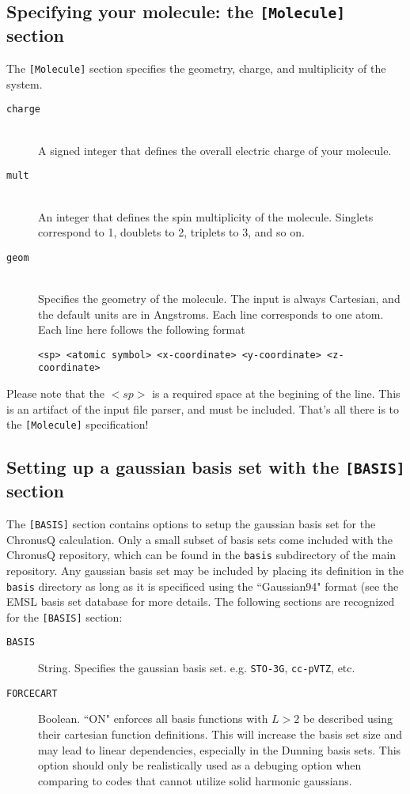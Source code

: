 \documentclass[12pt]{article}
\begin{document}
    \subsection{Specifying your molecule: the \texttt{[Molecule]} section} \label{subsec:MoleculeInput}
    The \texttt{[Molecule]} section specifies the geometry, charge, and multiplicity of the system. 
    \begin{description}
    \item[\texttt{charge}] \hfill \\
    A signed integer that defines the overall electric charge of your molecule.
    \item[\texttt{mult}] \hfill \\
    An integer that defines the spin multiplicity of the molecule. Singlets correspond to 1, doublets to 2, triplets to 3, and so on.
    \item[\texttt{geom}] \hfill \\
    Specifies the geometry of the molecule. The input is always Cartesian, and the default units are in Angstroms. Each line corresponds to one atom. Each line here follows the following format
          \begin{lstlisting}
<sp> <atomic symbol> <x-coordinate> <y-coordinate> <z-coordinate>
          \end{lstlisting} 
    \end{description}
    Please note that the $<sp>$ is a required space at the begining of the line. This is an artifact of the input file parser, and must be included. That's all there is to the \texttt{[Molecule]} specification!

    \subsection{Setting up a gaussian basis set with the \texttt{[BASIS]} section} \label{subsec:BasisInput}
    The \texttt{[BASIS]} section contains options to setup the gaussian basis set for the ChronusQ calculation. Only a small
    subset of basis sets come included with the ChronusQ repository, which can be found in the \texttt{basis} subdirectory of
    the main repository. Any gaussian basis set may be included by placing its definition in the \texttt{basis} directory as
    long as it is specificed using the ``Gaussian94" format (see the EMSL basis set database for more details. The following
    sections are recognized for the \texttt{[BASIS]} section:
    \begin{description}
      \item[\texttt{BASIS}] String. Specifies the gaussian basis set. e.g. \texttt{STO-3G}, \texttt{cc-pVTZ}, etc.
      \item[\texttt{FORCECART}] Boolean. ``ON" enforces all basis functions with $L>2$ be described using their 
        cartesian function definitions. This will increase the basis set size and may lead to linear dependencies,
        especially in the Dunning basis sets. This option should only be realistically used as a debuging option when
        comparing to codes that cannot utilize solid harmonic gaussians.
    \end{description}
\end{document}

